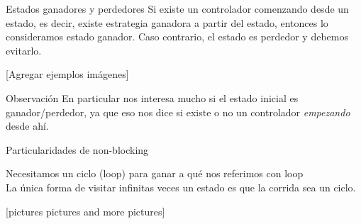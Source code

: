\begin{frame}{Estados ganadores y perdedores}
    Si existe un controlador comenzando desde un estado, es decir, existe estrategia ganadora a partir del estado, entonces lo consideramos estado ganador. 
    Caso contrario, el estado es perdedor y debemos evitarlo.
    
    [Agregar ejemplos imágenes]
    
    \begin{block}{Observación}
        En particular nos interesa mucho si el estado inicial es ganador/perdedor, ya que eso nos dice si existe o no un controlador \textit{empezando} desde ahí.
    \end{block}

\end{frame}
\begin{frame}{Particularidades de non-blocking}
    \begin{block}{Necesitamos un ciclo (loop) para ganar}
        a qué nos referimos con loop\\
        La única forma de visitar infinitas veces un estado es que la corrida sea un ciclo.
    \end{block}
    
    [pictures pictures and more pictures]
\end{frame}
